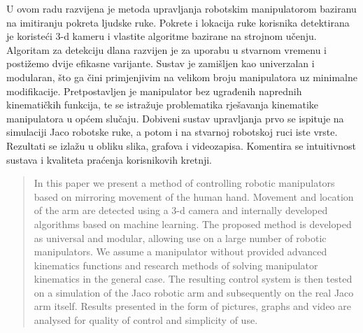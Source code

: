 \documentclass[times, utf8, diplomski, numeric]{fer}
\begin{document}
\begin{sazetak}
U ovom radu razvijena je metoda upravljanja robotskim manipulatorom baziranu na imitiranju pokreta ljudske ruke. Pokrete i lokacija ruke korisnika detektirana je koristeći 3-d kameru i vlastite algoritme bazirane na strojnom učenju. Algoritam za detekciju dlana razvijen je za uporabu u stvarnom vremenu i postižemo dvije efikasne varijante. Sustav je zamišljen kao univerzalan i modularan, što ga čini primjenjivim na velikom broju manipulatora uz minimalne modifikacije. Pretpostavljen je manipulator bez ugrađenih naprednih kinematičkih funkcija, te se istražuje problematika rješavanja kinematike manipulatora u općem slučaju. Dobiveni sustav upravljanja prvo se ispituje na simulaciji Jaco robotske ruke, a potom i na stvarnoj robotskoj ruci iste vrste. Rezultati se izlažu u obliku slika, grafova i videozapisa. Komentira se intuitivnost sustava i kvaliteta praćenja korisnikovih kretnji.

\end{sazetak}

\begin{abstract}
In this paper we present a method of controlling robotic manipulators based on mirroring movement of the human hand. Movement and location of the arm are detected using a 3-d camera and internally developed algorithms based on machine learning. The proposed method is developed as universal and modular, allowing use on a large number of robotic manipulators. We assume a manipulator without provided advanced kinematics functions and research methods of solving manipulator kinematics in the general case. The resulting control system is then tested on a simulation of the Jaco robotic arm and subsequently on the real Jaco arm itself. Results presented in the form of pictures, graphs and video are analysed for quality of control and simplicity of use.

\end{abstract}
\end{document}
